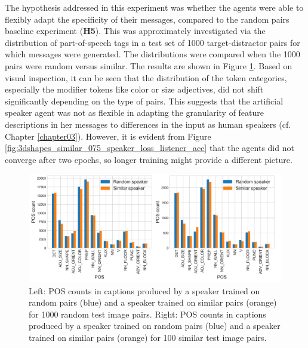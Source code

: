 The hypothesis addressed in this experiment was whether the agents were able to flexibly adapt the specificity of their messages, compared to the random pairs baseline experiment (\textbf{H5}). This was approximately investigated via the distribution of part-of-speech tags in a test set of 1000 target-distractor pairs for which messages were generated. The distributions were compared when the 1000 pairs were random versus similar. The results are shown in Figure \ref{fig:3dshapes_pos}. Based on visual inspection, it can be seen that the distribution of the token categories, especially the modifier tokens like color or size adjectives, did not shift significantly depending on the type of pairs. This suggests that the artificial speaker agent was not as flexible in adapting the granularity of feature descriptions in her messages to differences in the input as human speakers (cf. Chapter \ref{chapter03}). However, it is evident from Figure \ref{fig:3dshapes_similar_075_speaker_loss_listener_acc} that the agents did not converge after two epochs, so longer training might provide a different picture.  

\begin{figure}[h]
	\centering
	\includegraphics[width=\linewidth]{images/3dshapes_random_vs_similar_POS_counts.png}
	\caption{Left: POS counts in captions produced by a speaker trained on random pairs (blue) and a speaker trained on similar pairs (orange) for 1000 random test image pairs. Right: POS counts in captions produced by a speaker trained on random pairs (blue) and a speaker trained on similar pairs (orange) for 100 similar test image pairs. }
	\label{fig:3dshapes_pos}
\end{figure}

